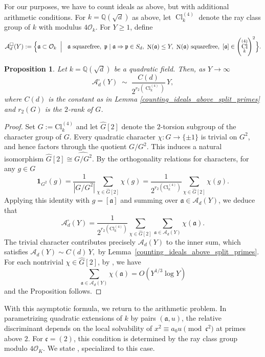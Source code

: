 \documentclass[11pt,reqno]{amsart}
\newcommand{\fa}{\mathfrak{a}}
\newcommand{\fp}{\mathfrak{p}}
\newcommand{\Q}{\mathbb{Q}}
\newcommand{\cA}{\mathcal{A}}
\newcommand{\cO}{\mathcal{O}}
\DeclareMathOperator{\Norm}{N}
\DeclareMathOperator{\Cl}{Cl}
\newtheorem{proposition}[theorem]{Proposition}
\theoremstyle{definition}
\theoremstyle{remark}
\begin{document}
For our purposes, we have to count ideals as above, but with additional arithmetic conditions. For $k=\Q(\sqrt{d})$ as above, let $\Cl_{k}^{(4)}$ denote the ray class group of $k$ with modulus $4\mathcal{O}_k$. For $Y \geq 1$, define
\[
\cA_d^\square(Y)
:=
\Bigl\{
\fa\subset\cO_k \; \Bigm| \;
\ \fa\ \text{squarefree},\ 
\fp\mid\fa\Rightarrow\fp\in S_d,\ 
\Norm(\fa)\le Y,\ 
\Norm(\fa)\ \text{squarefree},\ 
[\fa]\in \left(\Cl_{k}^{(4)} \right)^2
\Bigr\}.
\]


\begin{proposition}\label{prop:Adsquare}
Let $k=\Q(\sqrt d)$ be a quadratic field. Then, as $Y\to\infty$ 
\[
\cA_d^\square(Y)
\;\sim\;
\frac{C(d)}{2^{r_2(\Cl_k^{(4)})}}\,Y,
\]
where $C(d)$ is the constant as in Lemma \ref{counting_ideals_above_split_primes} and $r_2(G)$ is the $2$-rank of $G$.
\end{proposition}

\begin{proof}
Set $G := \mathrm{Cl}_k^{(4)}$ and let $\widehat{G}[2]$ denote the 
$2$-torsion subgroup of the character group of $G$. Every quadratic 
character $\chi \colon G \to \{\pm 1\}$ is trivial on $G^2$, and hence factors 
through the quotient $G/G^2$. This induces a natural isomorphism $\widehat{G}[2] \cong 
\widehat{G/G^2}$. By the orthogonality relations for characters, for any $g\in G$
\[
\mathbf{1}_{G^2}(g)
= \frac{1}{|G/G^2|}
\sum_{\chi \in \widehat{G}[2]} \chi(g)
= \frac{1}{2^{r_2(\mathrm{Cl}_k^{(4)})}}
\sum_{\chi \in \widehat{G}[2]} \chi(g).
\]
Applying this identity with $g=[\mathfrak{a}]$ and summing over 
$\mathfrak{a} \in \mathcal{A}_d(Y)$, we deduce that
\[
\cA_d^\square(Y)
= \frac{1}{2^{r_2(\mathrm{Cl}_k^{(4)})}}
\sum_{\chi \in \widehat{G}[2]}
\sum_{\mathfrak{a} \in \mathcal{A}_d(Y)} \chi(\mathfrak{a}).
\]
\noindent
The trivial character contributes precisely $\cA_d(Y)$ to the inner sum, which satisfies $\cA_d(Y) \sim C(d)\,Y,$  by Lemma~\ref{counting_ideals_above_split_primes}. For each nontrivial $\chi \in \widehat{G}[2]$, by \cite[Lemma 2]{McTu24}, we have
\begin{equation*}
    \sum_{\mathfrak{a} \in \mathcal{A}_d(Y)} \chi(\mathfrak{a}) = O(Y^{1/3}\log Y)
\end{equation*}
and the Proposition follows.
\end{proof}

\noindent
With this asymptotic formula, we return to the arithmetic problem. In parametrizing quadratic extensions of $k$ by pairs $(\fa,u)$, the relative discriminant depends on the local solvability of  $x^{2} \equiv a_{0}u \pmod{\mathfrak{c}^{2}}$ at primes above $2$. For $\mathfrak{c}=(2)$, this condition is determined by the ray class group modulo $4\cO_K$. We state \cite[Lemma 3.5]{CDO02}, specialized to this case.
\end{document}
